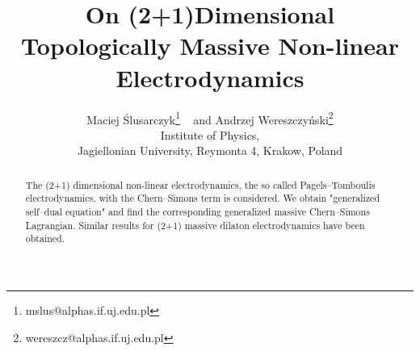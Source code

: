 \documentclass[a4 paper, 12 pt] {article}
\begin{document}
\title{\bf{On (2+1)Dimensional Topologically Massive Non-linear Electrodynamics}}
\author{Maciej \'{S}lusarczyk\thanks{mslus@alphas.if.uj.edu.pl} \mbox{ } and Andrzej
Wereszczy\'{n}ski\thanks{wereszcz@alphas.if.uj.edu.pl}
       \\ Institute of Physics,
       \\ Jagiellonian University, Reymonta 4, Krakow, Poland}

\maketitle
\begin{abstract}
The (2+1) dimensional non-linear electrodynamics, the so called
Pagels--Tomboulis electrodynamics, with the Chern--Simons term is
considered. We obtain "generalized self--dual equation" and find
the corresponding generalized massive Chern--Simons Lagrangian.
Similar results for (2+1) massive dilaton electrodynamics have
been obtained.
\end{abstract}


\end{document}
